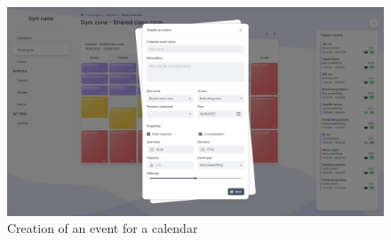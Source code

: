 \documentclass[a4paper, 12pt, oneside]{book}
\begin{document}
\begin{figure}[H]
	\centering
	\includegraphics[width=\textwidth]{assets/core-screenshots/create-event.png}
	\caption{Creation of an event for a calendar}
\end{figure}
\end{document}
